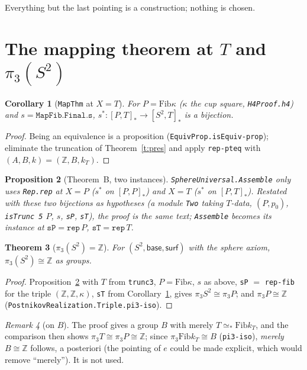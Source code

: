 \documentclass[11pt]{amsart}
\newtheorem{theorem}{Theorem}
\newtheorem{proposition}[theorem]{Proposition}
\newtheorem{corollary}[theorem]{Corollary}
\theoremstyle{definition}
\theoremstyle{remark}
\newtheorem{remark}[theorem]{Remark}
\newcommand{\Z}{\mathbb{Z}}
\newcommand{\code}[1]{\texttt{#1}}
\newcommand{\hc}[2]{[#1,#2]_*}
\newcommand{\Fib}{\mathrm{Fib}}
\begin{document}
Everything but the last pointing is a construction; nothing is chosen.

\section{The mapping theorem at $T$ and $\pi_3(S^2)$}

\begin{corollary}[\code{MapThm} at $X=T$]\label{c:mapT}
For $P=\Fib\kappa$ ($\kappa$ the cup square, \code{H4Proof.h4}) and
$s=\code{MapFib.Final.s}$, $s^*:\hc PT\to\hc{S^2}T$ is a bijection.
\end{corollary}
\begin{proof}
Being an equivalence is a proposition (\code{EquivProp.isEquiv-prop});
eliminate the truncation of Theorem~\ref{t:pres} and apply
\code{rep-pteq} with $(A,B,k)=(\Z,B,k_T)$.
\end{proof}

\begin{proposition}[Theorem~B, two instances]\label{p:two}
\code{SphereUniversal.Assemble} only uses \code{Rep.rep} at $X=P$
($s^*$ on $\hc PP$) and $X=T$ ($s^*$ on $\hc PT$). Restated with these two
bijections as hypotheses (a module \code{Two} taking $T$-data, $(P,p_0)$,
\code{isTrunc 5} $P$, $s$, \code{sP}, \code{sT}), the proof is the same
text; \code{Assemble} becomes its instance at
$\code{sP}=\code{rep}\,P$, $\code{sT}=\code{rep}\,T$.
\end{proposition}

\begin{theorem}[$\pi_3(S^2)=\Z$]\label{t:final}
For $(S^2,\mathsf{base},\mathsf{surf})$ with the sphere axiom,
$\pi_3(S^2)\cong\Z$ as groups.
\end{theorem}
\begin{proof}
Proposition~\ref{p:two} with $T$ from \code{trunc3}, $P=\Fib\kappa$,
$s$ as above, \code{sP} $=$ \code{rep-fib} for the triple $(\Z,\Z,\kappa)$,
\code{sT} from Corollary~\ref{c:mapT}, gives $\pi_3S^2\cong\pi_3P$; and
$\pi_3P\cong\Z$ (\code{PostnikovRealization.Triple.pi3-iso}).
\end{proof}

\begin{remark}[on $B$]
The proof gives a group $B$ with merely $T\simeq_*\Fib k_T$, and the
comparison then shows $\pi_3T\cong\pi_3P\cong\Z$; since $\pi_3\Fib k_T\cong B$
(\code{pi3-iso}), \emph{merely} $B\cong\Z$ follows, a posteriori (the
pointing of $e$ could be made explicit, which would remove ``merely''). It
is not used.
\end{remark}
\end{document}
